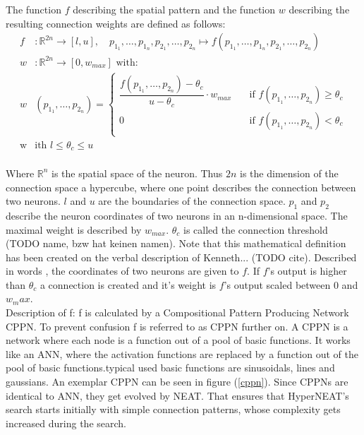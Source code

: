  The function $f$ describing the spatial pattern and the function  $w$ describing the resulting connection weights are defined as follows: 
 \label{HyperNEatFunction}
\begin{align*} 
 f&\colon \mathbb{R}^{2n} \to [l,u], \quad  p_{1_1},\ldots,p_{1_n},p_{2_1},\ldots,p_{2_n} \mapsto f(p_{1_1},\ldots,p_{1_n},p_{2_1},\ldots,p_{2_n})\\
 w&\colon \mathbb{R}^{2n} \to [0,w_{max}] \text{ with: }\\
 w&(p_{1_1},\ldots,p_{2_n})=\begin{cases}
 \dfrac{f(p_{1_1},\ldots,p_{2_n})-\theta_c}{u-\theta_c} \cdot w_{max} & \quad \text{if } f(p_{1_1},\ldots,p_{2_n}) \geq \theta_c \\
 0 & \quad \text{if } f(p_{1_1},\ldots,p_{2_n}) < \theta_c \\
 \end{cases}\\
 \text{w}&\text{ith } l\leq \theta_c \leq u  
 \end{align*}\\
 Where $\mathbb{R}^n$ is the spatial space of the neuron. Thus $2n$ is the dimension of the connection space a hypercube, where one point describes the connection between two neurons. $l$ and $u$ are the boundaries of the connection space. $p_1$ and $p_2$ describe the neuron coordinates of two neurons in an n-dimensional space. The maximal weight is described by $w_{max}$. $\theta_c$ is called the connection threshold (TODO name, bzw hat keinen namen).
 Note that this mathematical definition has been created on the verbal description of Kenneth... (TODO cite). Described in words , the coordinates of two neurons are given to $f$. If $f$'s output is higher than $\theta_c$ a connection is created and it's weight is $f$'s output scaled between $0$ and $w_max$.\\
Description of f:
f is calculated by a Compositional Pattern Producing Network CPPN. To prevent confusion f is referred to as CPPN further on. A CPPN is a network where each node is a function out of a pool of basic functions. It works like an ANN, where the activation functions are replaced by a function out of the pool of basic functions.typical used basic functions are sinusoidals, lines and gaussians. An exemplar CPPN can be seen in figure (\ref{cppn}).
Since CPPNs are identical to ANN, they get evolved by NEAT. That ensures that HyperNEAT's search starts initially with simple connection patterns, whose complexity gets increased during the search. 

